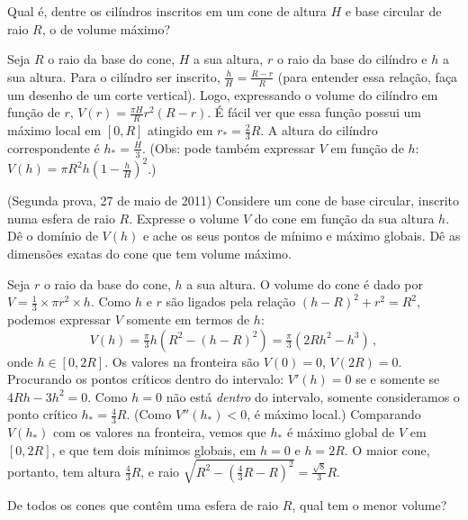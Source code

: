 \begin{exo}
Qual é, dentre os cilíndros inscritos em um cone de altura $H$ e base circular
de raio $R$, o de volume máximo?
\begin{sol}
Seja $R$ o raio da base do cone, $H$ a sua altura, $r$ o raio da base do
cilíndro e $h$ a sua altura.
Para o cilíndro ser inscrito, $\frac{h}{H}=\frac{R-r}{R}$ (para entender essa
relação, faça um desenho de um corte vertical).
Logo, expressando o volume do cilíndro em função de $r$, $V(r)=\frac{\pi
H}{R}r^2(R-r)$. É fácil ver que essa função possui um máximo local em $[0,R]$
atingido em $r_*=\frac{2}{3}R$. A altura do cilíndro correspondente é
$h_*=\frac{H}{3}$.
(Obs: pode também expressar $V$ em função de $h$: $V(h)=\pi
R^2h(1-\frac{h}{H})^2$.)
\end{sol}
\end{exo}

\begin{exo} (Segunda prova, 27 de maio de 2011)
Considere um cone de base circular, inscrito numa esfera de raio $R$.
Expresse o volume $V$ do cone em função da sua altura $h$. 
Dê o domínio de $V(h)$ e ache os seus pontos de mínimo e máximo globais. 
Dê as dimensões exatas do cone que tem volume máximo.
\begin{sol}
Seja $r$ o raio da base do cone, $h$ a sua altura.
O volume do cone é dado por $V=\tfrac13 \times \pi r^2\times h$. Como $h$ e
$r$ são ligados pela relação $(h-R)^2+r^2=R^2$, podemos expressar $V$ somente
em termos de $h$:
$$V(h)=\tfrac{\pi}{3}h(R^2-(h-R)^2)=\tfrac{\pi}{3}(2Rh^2-h^3)\,,$$
onde $h\in [0,2R]$.
Os valores na fronteira são $V(0)=0$, $V(2R)=0$.
Procurando os pontos críticos dentro do intervalo: $V'(h)=0$ se e somente se
$4Rh-3h^2=0$. Como $h=0$ não está \emph{dentro} do intervalo, somente
consideramos o ponto crítico $h_*=\tfrac{4}{3}R$. (Como $V''(h_*)<0$, é máximo
local.) Comparando $V(h_*)$ com os valores na fronteira, vemos que $h_*$ é
máximo global de $V$ em $[0,2R]$, e que tem dois mínimos globais, em $h=0$ e
$h=2R$. 
{O maior cone, portanto, tem altura $\tfrac{4}{3}R$, e raio
$\sqrt{R^2-(\tfrac{4}{3}R-R)^2}=\frac{\sqrt{8}}{3}R$.}
\end{sol}
\end{exo}

\begin{exo}\label{exo_coneemtornoesfera}
De todos os cones que contêm uma esfera de raio $R$, qual tem o menor
volume?
\end{exo}

